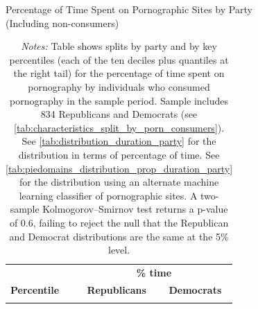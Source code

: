 \documentclass[12pt, letterpaper]{article}
\begin{document}
\begin{table}[ht] \centering \small \setlength\tabcolsep{10 pt}
	\caption{Percentage of Time Spent on Pornographic Sites by Party \\(Including non-consumers)}
	\label{tab:distribution_prop_duration_party_untruncated}
	\begin{adjustbox}{max width=\textwidth}
		\begin{tabular}{crr}
			\toprule
			\multicolumn{1}{l}{\textbf{}}&\multicolumn{2}{c}{\textbf{\% time}}\\
			\cmidrule(l){2-3}
			\multicolumn{1}{l}{\textbf{Percentile}}&\multicolumn{1}{c}{\textbf{Republicans}}&\multicolumn{1}{c}{\textbf{Democrats}}\\
			\midrule
			\\
			\bottomrule
		\end{tabular}
	\end{adjustbox}
	\caption*{\footnotesize \emph{Notes:} 
		Table shows splits by party and by key percentiles (each of the ten deciles plus quantiles at the right tail) for the percentage of time spent on pornography by individuals who consumed pornography in the sample period. 
		Sample includes 834 Republicans and Democrats (see \cref{tab:characteristics_split_by_porn_consumers}).
		See \cref{tab:distribution_duration_party} for the distribution in terms of percentage of time.
		See \cref{tab:piedomains_distribution_prop_duration_party} for the distribution using an alternate machine learning classifier of pornographic sites. 
		A two-sample Kolmogorov–Smirnov test returns a p-value of 0.6, failing to reject the null that the Republican and Democrat distributions are the same at the 5\% level.
	}
\end{table}

\FloatBarrier
\clearpage
\end{document}
